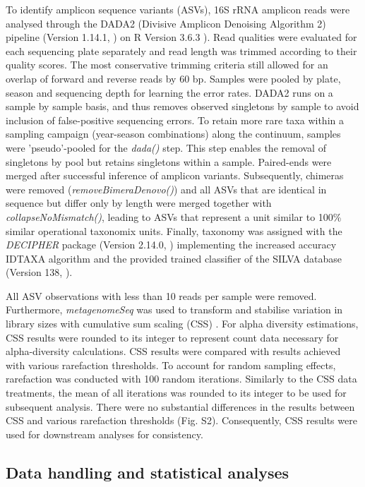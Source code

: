 \documentclass[12pt,a4paper]{article} %
\begin{document}
To identify amplicon sequence variants (ASVs), 16S rRNA amplicon reads were analysed through the DADA2 (Divisive Amplicon Denoising Algorithm 2) pipeline (Version 1.14.1, \citet{Callahan2017}) on R Version 3.6.3 \citep{RCoreTeam2017}). Read qualities were evaluated for each sequencing plate separately and read length was trimmed according to their quality scores. The most conservative trimming criteria still allowed for an overlap of forward and reverse reads by 60 bp. Samples were pooled by plate, season and sequencing depth for learning the error rates. DADA2 runs on a sample by sample basis, and thus removes observed singletons by sample to avoid inclusion of false-positive sequencing errors. To retain more rare taxa within a sampling campaign (year-season combinations) along the continuum, samples were 'pseudo'-pooled for the \textit{dada()} step.  This step enables the removal of singletons by pool but retains singletons within a sample. Paired-ends were merged after successful inference of amplicon variants. Subsequently, chimeras were removed (\textit{removeBimeraDenovo()}) and all ASVs that are identical in sequence but differ only by length were merged together with \textit{collapseNoMismatch()}, leading to ASVs that represent a unit similar to 100\% similar operational taxonomix units. Finally, taxonomy was assigned with the \textit{DECIPHER} package (Version 2.14.0, \citet{Wright2016}) implementing the increased accuracy IDTAXA algorithm \citep{Murali2018} and the provided trained classifier of the SILVA database (Version 138, \citet{Pruesse2007}).

All ASV observations with less than 10 reads per sample were removed. Furthermore, \textit{metagenomeSeq} was used to transform and stabilise variation in library sizes with cumulative sum scaling (CSS) \citep{Paulson2013}. For alpha diversity estimations, CSS results were rounded to its integer to represent count data necessary for alpha-diversity calculations. CSS results were compared with results achieved with various rarefaction thresholds. To account for random sampling effects, rarefaction was conducted with 100 random iterations. Similarly to the CSS data treatments, the mean of all iterations was rounded to its integer to be used for subsequent analysis. There were no substantial differences in the results between CSS and various rarefaction thresholds (Fig. S2). Consequently, CSS results were used for downstream analyses for consistency.

\subsection*{Data handling and statistical analyses}
\end{document}
